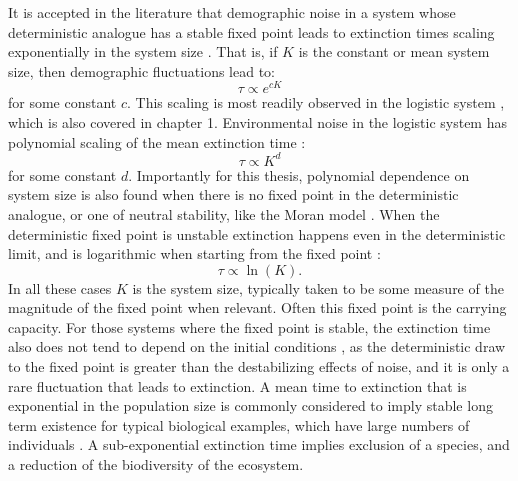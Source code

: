 It is accepted in the literature that demographic noise in a system whose deterministic analogue has a stable fixed point leads to extinction times scaling exponentially in the system size \cite{Leigh1981,Lande1993,Kamenev2008,Cremer2009a,Dobrinevski2012,Yu2017}. 
That is, if $K$ is the constant or mean system size, then demographic fluctuations lead to:
\begin{equation*}
\tau \propto e^{cK}
\end{equation*}
for some constant $c$. 
This scaling is most readily observed in the logistic system \cite{Norden1982,Foley1994,Allen2003a,Doering2005,Assaf2006,Assaf2010,Assaf2016}, which is also covered in chapter 1. %
Environmental noise in the logistic system has polynomial scaling of the mean extinction time \cite{Foley1994,Ovaskainen2010}:
\begin{equation*}
\tau \propto K^d
\end{equation*}
for some constant $d$. 
Importantly for this thesis, polynomial dependence on system size is also found when there is no fixed point in the deterministic analogue, or one of neutral stability, like the Moran model \cite{Cremer2009,Dobrinevski2012}. 
When the deterministic fixed point is unstable extinction happens even in the deterministic limit, and is logarithmic when starting from the fixed point \cite{Lande1993,Dobrinevski2012,Parsons2018}:
\begin{equation*}
\tau \propto \ln(K). 
\end{equation*}
In all these cases $K$ is the system size, typically taken to be some measure of the magnitude of the fixed point when relevant. 
Often this fixed point is the carrying capacity. 
For those systems where the fixed point is stable, the extinction time also does not tend to depend on the initial conditions \cite{Chotibut2015}, as the deterministic draw to the fixed point is greater than the destabilizing effects of noise, and it is only a rare fluctuation that leads to extinction. 
A mean time to extinction that is exponential in the population size is commonly considered to imply stable long term existence for typical biological examples, which have large numbers of individuals \cite{Ovaskainen2010,Lin2015}. 
A sub-exponential extinction time implies exclusion of a species, and a reduction of the biodiversity of the ecosystem. 

